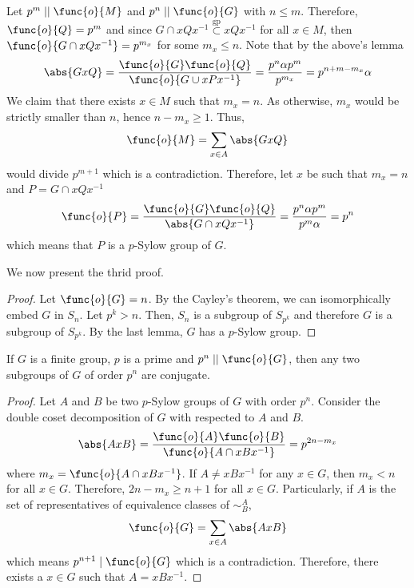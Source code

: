 \begin{prooflemma}
    Let \(p^m \mid\mid \func{o}{M}\) and \(p^n \mid \mid \func{o}{G}\) with \(n \leq m\). Therefore, \(\func{o}{Q} = p^m\) and since \(G \cap xQx^{-1} \overset{\mathrm{gp}}{\subset} xQx^{-1}\) for all \(x \in M\), then \(\func{o}{G \cap xQx^{-1}} = p^{m_x}\) for some \(m_x \leq n\). Note that by the above's lemma
    \begin{equation*}
        \abs{GxQ} =  \dfrac{\func{o}{G} \func{o}{Q}}{\func{o}{G \cup xPx^{-1}}} = \dfrac{p^n \alpha p^m}{p^{m_x}} = p^{n + m - m_x} \alpha
    \end{equation*}
    We claim that there exists \(x \in M\) such that \(m_x = n\). As otherwise, \(m_x\) would be strictly smaller than \(n\), hence \(n - m_x \geq 1\). Thus, 
    \begin{equation*}
        \func{o}{M} = \sum_{x \in A} \abs{GxQ}
    \end{equation*}
    would divide \(p^{m+1}\) which is a contradiction. Therefore, let \(x\) be such that \(m_x  = n\) and \(P = G \cap xQx^{-1}\)
    \begin{equation*}
        \func{o}{P} = \dfrac{\func{o}{G} \func{o}{Q}}{\abs{G \cap xQx^{-1}}} = \dfrac{p^n \alpha p^m}{p^m \alpha} = p^n
    \end{equation*}
    which means that \(P\) is a \(p\)-Sylow group of \(G\).
\end{prooflemma}

We now present the thrid proof.
\begin{proof}
    Let \(\func{o}{G} = n\). By the Cayley's theorem, we can isomorphically embed \(G\) in \(S_n\). Let \(p^k > n\). Then, \(S_n\) is a subgroup of \(S_{p^k}\) and therefore \(G\) is a subgroup of \(S_{p^k}\). By the last lemma, \(G\) has a \(p\)-Sylow group.
\end{proof}

\begin{theorem}
    If \(G\) is a finite group, \(p\) is a prime and \(p^n \mid\mid \func{o}{G}\), then any two subgroups of \(G\) of order \(p^n\) are conjugate.
\end{theorem}

\begin{proof}
    Let \(A\) and \(B\) be two \(p\)-Sylow groups of \(G\) with order \(p^n\). Consider the double coset decomposition of \(G\) with respected to \(A\) and \(B\).
    \begin{equation*}
        \abs{AxB} = \dfrac{\func{o}{A} \func{o}{B}}{\func{o}{A \cap xBx^{-1}}} = p^{2n - m_x}
    \end{equation*}
    where \(m_x = \func{o}{A \cap xBx^{-1}}\). If \(A \neq xBx^{-1}\) for any \(x \in G\), then \(m_x < n\) for all \(x \in G\). Therefore, \(2n -m_x \geq n + 1\) for all \(x \in G\). Particularly, if \(A\) is the set of representatives of equivalence classes of \(\sim^A_B\), 
    \begin{equation*}
        \func{o}{G} = \sum_{x \in A} \abs{AxB}
    \end{equation*}
    which means \(p^{n+1} \mid \func{o}{G}\) which is a contradiction. Therefore, there exists a \(x \in G\) such that \(A = xBx^{-1}\).
\end{proof}

